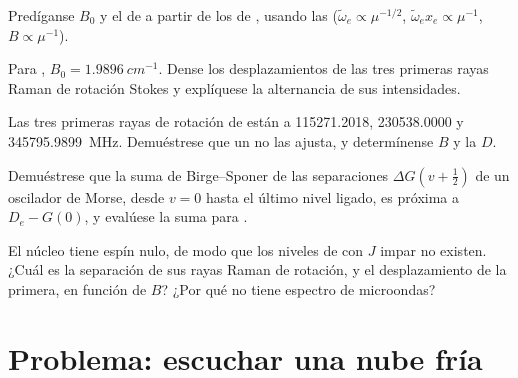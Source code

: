 \begin{exercise}[$\star\star$]\label{exo:b3:rovibrational-spectroscopy:8}
Predíganse $B_0$ y el  de  a partir de los de , usando
las  ($\tilde\omega_e \propto \mu^{-1/2}$, $\tilde\omega_ex_e \propto
\mu^{-1}$, $B \propto \mu^{-1}$).
\end{exercise}

\begin{exercise}[$\star\star$]\label{exo:b3:rovibrational-spectroscopy:9}
Para , $B_0 = \qty{1.9896}{cm^{-1}}$. Dense los desplazamientos de las tres primeras
rayas Raman de rotación Stokes y explíquese la alternancia de sus
intensidades.
\end{exercise}

\begin{exercise}[$\star\star\star$]\label{exo:b3:rovibrational-spectroscopy:10}
Las tres primeras rayas de rotación de  están a 115271.2018,
230538.0000 y \qty{345795.9899}{MHz}. Demuéstrese que un  no las ajusta,
y determínense $B$ y la  $D$.
\end{exercise}

\begin{exercise}[$\star\star\star$]\label{exo:b3:rovibrational-spectroscopy:11}
Demuéstrese que la suma de Birge--Sponer de las separaciones $\Delta G(v + \frac12)$ de un oscilador
de Morse, desde $v = 0$ hasta el último nivel ligado, es próxima a $D_e - G(0)$, y
evalúese la suma para .
\end{exercise}

\begin{exercise}[$\star\star\star$]\label{exo:b3:rovibrational-spectroscopy:12}
El núcleo  tiene espín nulo, de modo que los niveles de  con $J$
impar no existen. ¿Cuál es la separación de sus rayas Raman de rotación, y el
desplazamiento de la primera, en función de $B$? ¿Por qué  no tiene espectro de
microondas?
\end{exercise}

\section{Problema: escuchar una nube fría}

